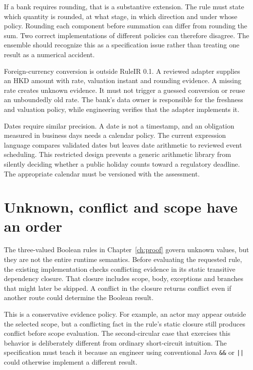 \documentclass[12pt,a4paper,oneside,openany]{book}
\begin{document}
If a bank requires rounding, that is a substantive extension. The rule must state
which quantity is rounded, at what stage, in which direction and under whose
policy. Rounding each component before summation can differ from rounding the
sum. Two correct implementations of different policies can therefore disagree.
The ensemble should recognize this as a specification issue rather than treating
one result as a numerical accident.

Foreign-currency conversion is outside RuleIR 0.1. A reviewed adapter supplies an
HKD amount with rate, valuation instant and rounding evidence. A missing rate
creates unknown evidence. It must not trigger a guessed conversion or reuse an
unboundedly old rate. The bank's data owner is responsible for the freshness and
valuation policy, while engineering verifies that the adapter implements it.

Dates require similar precision. A date is not a timestamp, and an obligation
measured in business days needs a calendar policy. The current expression
language compares validated dates but leaves date arithmetic to reviewed event
scheduling. This restricted design prevents a generic arithmetic library from
silently deciding whether a public holiday counts toward a regulatory deadline.
The appropriate calendar must be versioned with the assessment.

\section{Unknown, conflict and scope have an order}
\label{merge:M07:03}


The three-valued Boolean rules in Chapter~\ref{ch:proof} govern unknown values,
but they are not the entire runtime semantics. Before evaluating the requested
rule, the existing implementation checks conflicting evidence in its static
transitive dependency closure. That closure includes scope, body, exceptions and
branches that might later be skipped. A conflict in the closure returns conflict
even if another route could determine the Boolean result.

This is a conservative evidence policy. For example, an actor may appear outside
the selected scope, but a conflicting fact in the rule's static closure still
produces conflict before scope evaluation. The second-circular case that exercises
this behavior is deliberately different from ordinary short-circuit intuition.
The specification must teach it because an engineer using conventional Java
\texttt{\&\&} or \texttt{||} could otherwise implement a different result.
\end{document}
